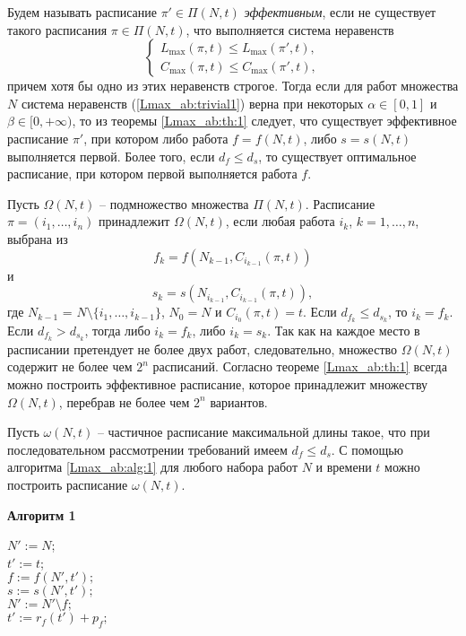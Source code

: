 Будем называть расписание $\pi' \in \Pi(N,t)$ \textit{эффективным}, если не существует такого расписания $\pi \in \Pi(N,t)$, что выполняется система неравенств
\begin{equation*}
    \begin{cases}
        L_{\max}(\pi, t) \leq L_{\max} (\pi', t),\\
        C_{\max}(\pi, t) \leq C_{\max} (\pi', t),
    \end{cases}
\end{equation*}
причем хотя бы одно из этих неравенств строгое. Тогда если для работ множества $N$ система неравенств (\ref{Lmax_ab:trivial1}) верна при некоторых $\alpha \in [0,1]$ и $\beta \in [0, +\infty)$, то из теоремы \ref{Lmax_ab:th:1} следует, что существует эффективное расписание $\pi'$, при котором либо работа $f = f(N, t)$, либо $s = s(N, t)$ выполняется первой. Более того, если $d_f \leq d_s$, то существует оптимальное расписание, при котором первой выполняется работа $f$.

Пусть $\Omega(N,t)$ -- подмножество множества $\Pi(N,t)$. Расписание $\pi = (i_1, \dots, i_n)$ принадлежит $\Omega (N,t)$, если любая работа $i_k$,
$k = 1,\dots, n$, выбрана из
$$f_k = f(N_{k-1},C_{i_{k-1}}(\pi,t))$$
и
$$s_k = s(N_{i_{k-1}},C_{i_{k-1}}(\pi,t)),$$
где $N_{k-1}$ = $N \setminus \{i_1,\dots,i_{k-1}\} $, $N_0 = N$ и $C_{i_0}(\pi,t) = t$.
Если $d_{f_{k}} \leq d_{s_k}$, то $i_k = f_k$. Если $d_{f_{k}} > d_{s_k}$, тогда либо $i_k = f_k$, либо $i_k = s_k$.
Так как на каждое место в расписании претендует не более двух работ, следовательно, множество $\Omega(N,t)$ содержит не более чем $2^n$ расписаний.
Согласно теореме \ref{Lmax_ab:th:1} всегда можно построить эффективное расписание, которое принадлежит множеству $\Omega(N,t)$, перебрав не более чем $2^n$ вариантов.

Пусть $\omega(N,t)$ -- частичное расписание максимальной длины такое, что при последовательном рассмотрении требований имеем $d_f \leq d_s$. С помощью алгоритма \ref{Lmax_ab:alg:1} для любого набора работ $N$ и времени $t$ можно построить расписание $\omega(N,t)$.

\begin{algorithm}[H]
\NoCaptionOfAlgo
\caption{\textbf{Алгоритм 1}\label{Lmax_ab:alg:1}}
\small
\SetAlgoLined
{}
$N':=N$;\\
$t' := t$;\\
$f:=f(N',t');$\\
$s:=s(N',t');$\\
$N':=N' \setminus f;$\\
$t':=r_f(t') + p_f;$\\
\end{algorithm}
\normalsize

